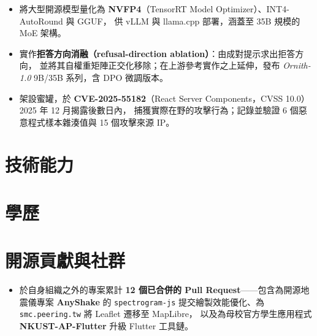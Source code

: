 \documentclass[10pt,a4paper]{article}
\begin{document}
\begin{itemize}
  \item 將大型開源模型量化為 \textbf{NVFP4}（TensorRT Model Optimizer）、INT4-AutoRound 與 GGUF，
        供 vLLM 與 llama.cpp 部署，涵蓋至 35B 規模的 MoE 架構。
  \item 實作\textbf{拒答方向消融（refusal-direction ablation）}：由成對提示求出拒答方向，
        並將其自權重矩陣正交化移除；在上游參考實作之上延伸，發布 \textit{Ornith-1.0} 9B/35B 系列，含 DPO 微調版本。
\end{itemize}

\begin{itemize}
  \item 架設蜜罐，於 \textbf{CVE-2025-55182}（React Server Components，CVSS 10.0）2025 年 12 月揭露後數日內，
        捕獲實際在野的攻擊行為；記錄並驗證 6 個惡意程式樣本雜湊值與 15 個攻擊來源 IP。
\end{itemize}

\section{技術能力}

\section{學歷}

\section{開源貢獻與社群}
\begin{itemize}
  \item 於自身組織之外的專案累計 \textbf{12 個已合併的 Pull Request}——包含為開源地震儀專案 \textbf{AnyShake} 的
        \texttt{spectrogram-js} 提交繪製效能優化、為 \texttt{smc.peering.tw} 將 Leaflet 遷移至 MapLibre，
        以及為母校官方學生應用程式 \textbf{NKUST-AP-Flutter} 升級 Flutter 工具鏈。
\end{itemize}
\end{document}
